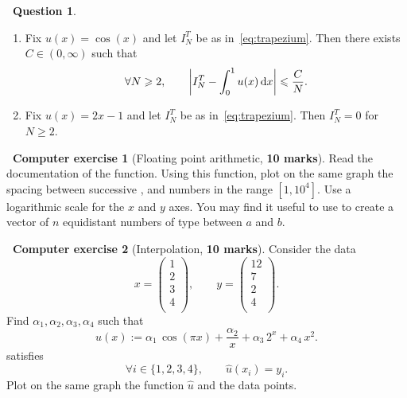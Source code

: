 \documentclass[11pt]{article}
\theoremstyle{definition}
\newtheorem{question}{{\normalfont \faGears}~Question}
\newtheorem{compexercise}{{\normalfont \faLaptop}~Computer exercise}
\renewcommand{\mymarks}[1]{\textbf{#1 marks}}
\begin{document}
\begin{question}
\begin{enumerate}
        \item
            Fix $u(x) = \cos(x)$ and let $I^T_N$ be as in~\eqref{eq:trapezium}.
            Then there exists $C \in (0, \infty)$ such that
            \[
                \forall N \geqslant 2, \qquad
                \left\lvert I^T_N - \int_{0}^1 u(x) \, \mathrm d x \right\rvert \leqslant \frac{C}{N}.
            \]

        \item
            Fix $u(x) = 2x - 1$ and let $I^T_N$ be as in~\eqref{eq:trapezium}.
            Then $I^T_N = 0$ for $N \geq 2$.
    \end{enumerate}
\end{question}

\newpage

\begin{compexercise}
    [Floating point arithmetic, \mymarks{10}]
    Read the documentation of the  function.
    Using this function,
    plot on the same graph the spacing between successive ,  and  numbers in the range $[1, 10^4]$.
    Use a logarithmic scale for the $x$ and $y$ axes.
    You may find it useful to use 
    to create a vector of $n$ equidistant numbers of type  between $a$ and $b$.
\end{compexercise}

\begin{compexercise}
    [Interpolation, \mymarks{10}]
    Consider the data
    \[
        x =
        \begin{pmatrix}
            1 \\
            2 \\
            3 \\
            4 \\
        \end{pmatrix},
        \qquad
        y =
        \begin{pmatrix}
            12 \\
            7 \\
            2 \\
            4 \\
        \end{pmatrix}.
    \]
    Find $\alpha_1, \alpha_2, \alpha_3, \alpha_4$ such that
    \[
        \widehat u(x) := \alpha_1 \, \cos(\pi x) + \frac{\alpha_2}{x} + \alpha_3 \, 2^x + \alpha_4 \, x^2.
    \]
    satisfies
    \[
        \forall i \in \{1, 2, 3, 4\}, \qquad
        \widehat u(x_i) = y_i.
    \]
    Plot on the same graph the function $\widehat u$ and the data points.
\end{compexercise}
\end{document}
